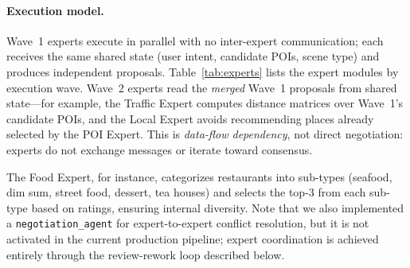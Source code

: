 \begin{table}[!t]
\centering
\caption{Expert modules organized by execution wave.}
\label{tab:experts}
\end{table}

\paragraph{Execution model.}
Wave~1 experts execute in parallel with no inter-expert communication; each receives the same shared state (user intent, candidate POIs, scene type) and produces independent proposals. Table~\ref{tab:experts} lists the expert modules by execution wave. Wave~2 experts read the \textit{merged} Wave~1 proposals from shared state---for example, the Traffic Expert computes distance matrices over Wave~1's candidate POIs, and the Local Expert avoids recommending places already selected by the POI Expert. This is \textit{data-flow dependency}, not direct negotiation: experts do not exchange messages or iterate toward consensus.

The Food Expert, for instance, categorizes restaurants into sub-types (seafood, dim sum, street food, dessert, tea houses) and selects the top-3 from each sub-type based on ratings, ensuring internal diversity. Note that we also implemented a \texttt{negotiation\_agent} for expert-to-expert conflict resolution, but it is not activated in the current production pipeline; expert coordination is achieved entirely through the review-rework loop described below.

